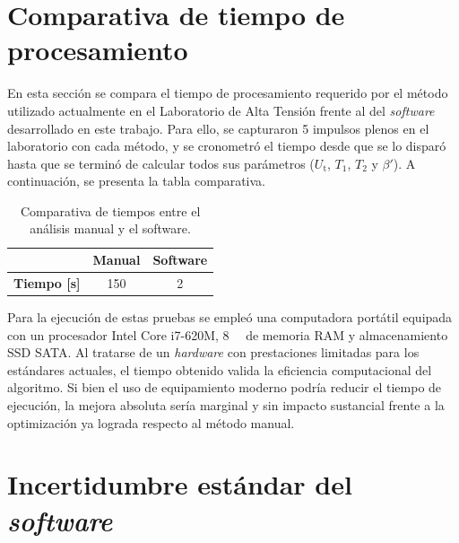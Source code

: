 \section*{Comparativa de tiempo de procesamiento}
\label{sec:comparativa_tiempo}
\vspace{3\baselineskip}

En esta sección se compara el tiempo de procesamiento requerido por el método utilizado actualmente en el Laboratorio de Alta Tensión frente al del \emph{software} desarrollado en este trabajo. Para ello, se capturaron \num{5} impulsos plenos en el laboratorio con cada método, y se cronometró el tiempo desde que se lo disparó hasta que se terminó de calcular todos sus parámetros ($U_\text{t}$, $T_1$, $T_2$ y $\beta'$). A continuación, se presenta la tabla comparativa.

\vspace{3\baselineskip}
\begin{table}[H]
    \centering
    \begin{tabular}{@{}ccc@{}}
        \toprule
                            & \textbf{Manual} & \textbf{Software} \\ \midrule
        \textbf{Tiempo [s]} & \num{150}       & \num{2}           \\ \bottomrule
    \end{tabular}
    \caption{Comparativa de tiempos entre el análisis manual y el software.}
    \label{tab:tiempo_manual_software}
\end{table}
\vspace{3\baselineskip}

Para la ejecución de estas pruebas se empleó una computadora portátil equipada con un procesador Intel Core i7-620M, \qty{8}{\giga\byte} de memoria RAM y almacenamiento SSD SATA. Al tratarse de un \emph{hardware} con prestaciones limitadas para los estándares actuales, el tiempo obtenido valida la eficiencia computacional del algoritmo. Si bien el uso de equipamiento moderno podría reducir el tiempo de ejecución, la mejora absoluta sería marginal y sin impacto sustancial frente a la optimización ya lograda respecto al método manual.

\section*{Incertidumbre estándar del \emph{software}}
\label{sec:incertidumbre_software}
\vspace{3\baselineskip}

